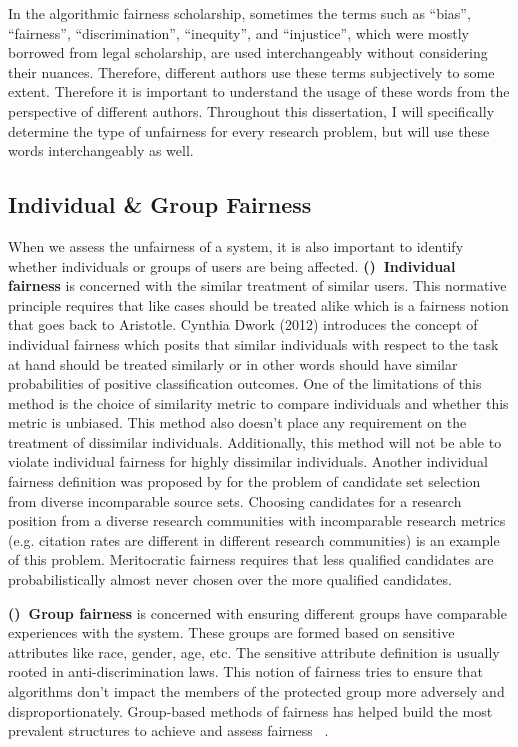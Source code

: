     In the algorithmic fairness scholarship, sometimes the terms such as ``bias'', ``fairness'', ``discrimination'', ``inequity'', and ``injustice'', which were mostly borrowed from legal scholarship, are used interchangeably without considering their nuances. Therefore, different authors use these terms subjectively to some extent. Therefore it is important to understand the usage of these words from the perspective of different authors. Throughout this dissertation, I will specifically determine the type of unfairness for every research problem, but will use these words interchangeably as well.
    
    \subsection{Individual \& Group Fairness}
        
        When we assess the unfairness of a system, it is also important to identify whether individuals or groups of users are being affected. \textbf{()~Individual fairness} is concerned with the similar treatment of similar users. This normative principle requires that like cases should be treated alike \cite{binns2020conflict} which is a fairness notion that goes back to Aristotle. Cynthia Dwork (2012) \cite{Dwork2012individual} introduces the concept of individual fairness which posits that similar individuals with respect to the task at hand should be treated similarly or in other words should have similar probabilities of positive classification outcomes. One of the limitations of this method is the choice of similarity metric to compare individuals and whether this metric is unbiased. This method also doesn't place any requirement on the treatment of dissimilar individuals. Additionally, this method will not be able to violate individual fairness for highly dissimilar individuals. Another individual fairness definition was proposed by \cite{pmlr-v70-kearns17a} for the problem of candidate set selection from diverse incomparable source sets. Choosing candidates for a research position from a diverse research communities with incomparable research metrics (e.g. citation rates are different in different research communities) is an example of this problem. Meritocratic fairness requires that less qualified candidates are probabilistically almost never chosen over the more qualified candidates.
        
        \textbf{()~Group fairness} is concerned with ensuring different groups have comparable experiences with the system. These groups are formed based on sensitive attributes like race, gender, age, etc. The sensitive attribute definition is usually rooted in anti-discrimination laws\cite{barocas2016big}. This notion of fairness tries to ensure that algorithms don't impact the members of the protected group more adversely and disproportionately. Group-based methods of fairness has helped build the most prevalent structures to achieve and assess fairness ~\cite{zemel2013learning,kamishima2012fairness,kamiran2010discrimination,zhang2017anti}.
        
